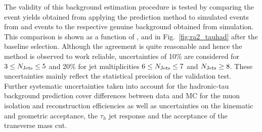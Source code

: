 The validity of this background estimation procedure is tested by comparing the event yields obtained from applying the prediction method to simulated events from \ttbar and \WJets events to the respective genuine background obtained from simulation. This comparison is shown as a function of \HT, \MHT and \NJets in Fig.~\ref{fig:ra2_tauhad} after the baseline selection. Although the agreement is quite reasonable and hence the method is observed to work reliable, uncertainties of 10\% are considered for $3 \leq N_{\text{Jets}} \leq 5$ and 20\% for jet multiplicities $6 \leq N_{\text{Jets}} \leq 7$ and $N_{\text{Jets}} \ge 8$. These uncertainties mainly reflect the statistical precision of the validation test. \\
Further systematic uncertainties taken into account for the hadronic-tau background prediction cover differences between data and MC for the muon isolation and reconstruction efficiencies as well as uncertainties on the kinematic and geometric acceptance, the $\tau_h$ jet response and the acceptance of the transverse mass cut. 

